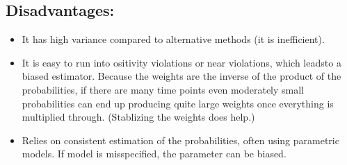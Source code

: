 \documentclass[]{article}
\providecommand{\tightlist}{%
  \setlength{\itemsep}{0pt}\setlength{\parskip}{0pt}}
\begin{document}
\subsection{Disadvantages:}\label{disadvantages}

\begin{itemize}
\tightlist
\item
  It has high variance compared to alternative methods (it is
  inefficient).
\item
  It is easy to run into ositivity violations or near violations, which
  leadsto a biased estimator. Because the weights are the inverse of the
  product of the probabilities, if there are many time points even
  moderately small probabilities can end up producing quite large
  weights once everything is multiplied through. (Stablizing the weights
  does help.)
\item
  Relies on consistent estimation of the probabilities, often using
  parametric models. If model is misspecified, the parameter can be
  biased.
\end{itemize}
\end{document}
